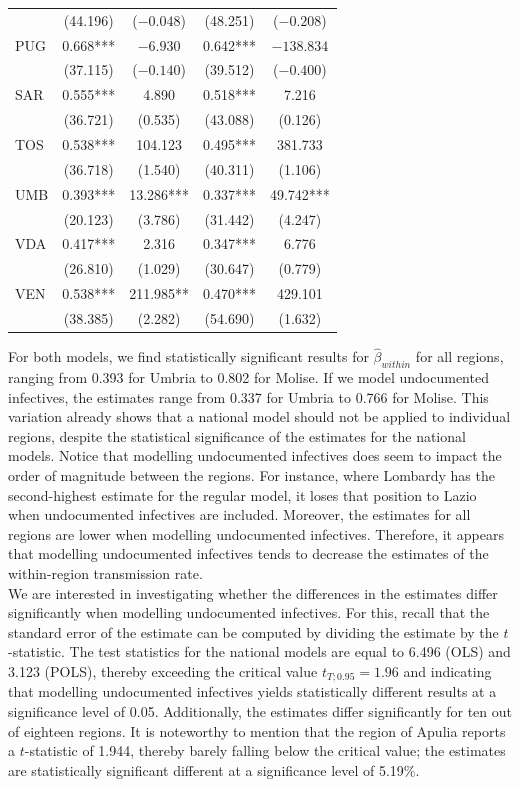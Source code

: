 \documentclass[12pt]{article}
\begin{document}
\begin{longtable}{@{}lcccc@{}}
         & (44.196) & ($-0.048$) & (48.251) & ($-0.208$) \\ 
        PUG & 0.668*** & $-6.930$ & 0.642*** & $-138.834$ \\ 
         & (37.115) & ($-0.140$) & (39.512) & ($-0.400$) \\ 
        SAR & 0.555*** & 4.890 & 0.518*** & 7.216 \\ 
         & (36.721) & (0.535) & (43.088) & (0.126) \\ 
        TOS & 0.538*** & 104.123 & 0.495*** & 381.733 \\ 
         & (36.718) & (1.540) & (40.311) & (1.106) \\ 
        UMB & 0.393*** & 13.286*** & 0.337*** & 49.742*** \\ 
         & (20.123) & (3.786) & (31.442) & (4.247) \\ 
        VDA & 0.417*** & 2.316 & 0.347*** & 6.776 \\ 
         & (26.810) & (1.029) & (30.647) & (0.779) \\ 
        VEN & 0.538*** & 211.985** & 0.470*** & 429.101 \\  
         & (38.385) & (2.282) & (54.690) & (1.632) \\* \bottomrule
	\end{longtable}

    For both models, we find statistically significant results for $\widehat{\beta}_{within}$ for all regions, ranging from 0.393 for Umbria to 0.802 for Molise. If we model undocumented infectives, the estimates range from 0.337 for Umbria to 0.766 for Molise. This variation already shows that a national model should not be applied to individual regions, despite the statistical significance of the estimates for the national models. Notice that modelling undocumented infectives does seem to impact the order of magnitude between the regions. For instance, where Lombardy has the second-highest estimate for the regular model, it loses that position to Lazio when undocumented infectives are included. Moreover, the estimates for all regions are lower when modelling undocumented infectives. Therefore, it appears that modelling undocumented infectives tends to decrease the estimates of the within-region transmission rate. \\

    We are interested in investigating whether the differences in the estimates differ significantly when modelling undocumented infectives. For this, recall that the standard error of the estimate can be computed by dividing the estimate by the $t$-statistic. The test statistics for the national models are equal to 6.496 (OLS) and 3.123 (POLS), thereby exceeding the critical value $t_{T;0.95} = 1.96$ and indicating that modelling undocumented infectives yields statistically different results at a significance level of 0.05. Additionally, the estimates differ significantly for ten out of eighteen regions. It is noteworthy to mention that the region of Apulia reports a $t$-statistic of 1.944, thereby barely falling below the critical value; the estimates are statistically significant different at a significance level of 5.19\%. \\
\end{document}
